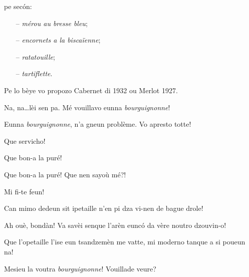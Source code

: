 \begin{drama}
pe sec\'on:

\begin{itemize}
\item[--] \textit{mérou au bresse bleu};
\item[--]  \textit{encornets a la biscaïenne};
\item[--]  \textit{ratatouille};
\item[--]  \textit{tartiflette}.
\end{itemize}

Pe lo bèye vo propozo Cabernet di 1932 ou Merlot 1927.


\PersEmpourtantaspeaks Na, na\ldots lèi sen pa. Mé vouillavo eunna \textit{bourguignonne}!

\Tsambrispeaks Eunna \textit{bourguignonne}, n'a gneun problème. Vo apresto totte!


\PersEmpourtantaspeaks{} Que servicho!

\Gerominespeaks {} Que bon-a la puré!

\Casimirspeaks{} Que bon-a la puré! Que nen sayoù mé?!

\Gerominespeaks Mi fi-te feun!


\Gerominespeaks Can mimo dedeun sit ipetaille n’en pi dza vi-nen de bague drole!

\Casimirspeaks Ah ouè, bondàn! Va savèi senque l’arèn eunc\'o da vère noutro dzouvin-o!

\Gerominespeaks Que l’opetaille l’ise eun tsandzemèn me vatte, mi moderno tanque a si poueun na!


\Tsambrispeaks Mesieu la voutra \textit{bourguignonne}! Vouillade veure?


\ridocliou

\newpage


\end{drama}
